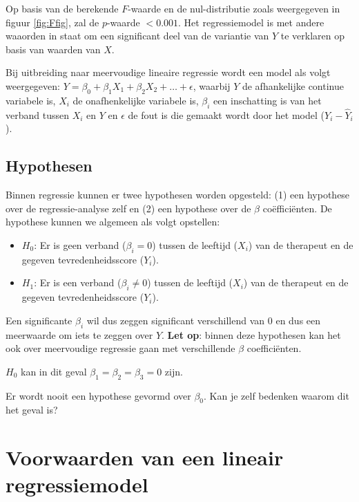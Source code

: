 \documentclass[
]{book}
\providecommand{\tightlist}{%
  \setlength{\itemsep}{0pt}\setlength{\parskip}{0pt}}
\theoremstyle{definition}
\theoremstyle{definition}
\theoremstyle{definition}
\theoremstyle{definition}
\theoremstyle{remark}
\begin{document}
Op basis van de berekende \(F\)-waarde en de nul-distributie zoals weergegeven in figuur \ref{fig:Ffig}, zal de \(p\)-waarde \(< 0.001\). Het regressiemodel is met andere waaorden in staat om een significant deel van de variantie van \(Y\) te verklaren op basis van waarden van \(X\).

Bij uitbreiding naar meervoudige lineaire regressie wordt een model als volgt weergegeven: \(Y = \beta_0 + \beta_1X_1 + \beta_2X_2 + … + \epsilon\), waarbij \(Y\) de afhankelijke continue variabele is, \(X_i\) de onafhenkelijke variabele is, \(\beta_i\) een inschatting is van het verband tussen \(X_i\) en \(Y\) en \(\epsilon\) de fout is die gemaakt wordt door het model (\(Y_i - \hat{Y}_i\)).

\hypertarget{hypothesen}{%
\subsection*{Hypothesen}\label{hypothesen}}


Binnen regressie kunnen er twee hypothesen worden opgesteld: (1) een hypothese over de regressie-analyse zelf en (2) een hypothese over de \(\beta\) coëfficiënten. De hypothese kunnen we algemeen als volgt opstellen:

\begin{itemize}
\tightlist
\item
  \(H_0\): Er is geen verband (\(\beta_i = 0\)) tussen de leeftijd (\(X_i\)) van de therapeut en de gegeven tevredenheidsscore (\(Y_i\)).
\item
  \(H_1\): Er is een verband (\(\beta_i \neq 0\)) tussen de leeftijd (\(X_i\)) van de therapeut en de gegeven tevredenheidsscore (\(Y_i\)).
\end{itemize}

Een significante \(\beta_i\) wil dus zeggen significant verschillend van 0 en dus een meerwaarde om iets te zeggen over \(Y\). \textbf{Let op}: binnen deze hypothesen kan het ook over meervoudige regressie gaan met verschillende \(\beta\) coefficiënten.

\(H_0\) kan in dit geval \(\beta_1 = \beta_2 = \beta_3 = 0\) zijn.

Er wordt nooit een hypothese gevormd over \(\beta_0\). Kan je zelf bedenken waarom dit het geval is?

\hypertarget{voorwaarden-van-een-lineair-regressiemodel}{%
\section*{Voorwaarden van een lineair regressiemodel}\label{voorwaarden-van-een-lineair-regressiemodel}}
\end{document}
